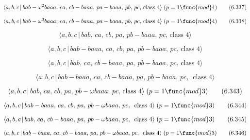 \documentclass[10pt]{article}
\begin{document}
\begin{equation}
\langle a,b,c\,|\,bab-\omega ^2baaa,\,ca,\,cb-baaa,\,pa-baaa,\,pb,\,pc,\,%
\text{class }4\rangle\;(p=1 \func{mod} 4)  \tag{6.337}
\end{equation}

\begin{equation}
\langle a,b,c\,|\,bab-\omega ^3baaa,\,ca,\,cb-baaa,\,pa-baaa,\,pb,\,pc,\,%
\text{class }4\rangle\;(p=1 \func{mod} 4)  \tag{6.338}
\end{equation}

\begin{equation}
\langle a,b,c\,|\,bab,\,ca,\,cb,\,pa,\,pb-baaa,\,pc,\,\text{class }4\rangle 
\tag{6.339}
\end{equation}

\begin{equation}
\langle a,b,c\,|\,bab-baaa,\,ca,\,cb,\,pa,\,pb-baaa,\,pc,\,\text{class }%
4\rangle  \tag{6.340}
\end{equation}

\begin{equation}
\langle a,b,c\,|\,bab,\,ca,\,cb-baaa,\,pa,\,pb-baaa,\,pc,\,\text{class }%
4\rangle  \tag{6.341}
\end{equation}

\begin{equation}
\langle a,b,c\,|\,bab-baaa,\,ca,\,cb-baaa,\,pa,\,pb-baaa,\,pc,\,\text{ class 
}4\rangle  \tag{6.342}
\end{equation}

\begin{equation}
\langle a,b,c\,|\,bab,\,ca,\,cb,\,pa,\,pb-\omega baaa,\,pc,\,\text{class }%
4\rangle\;(p=1 \func{mod} 3)  \tag{6.343}
\end{equation}

\begin{equation}
\langle a,b,c\,|\,bab-baaa,\,ca,\,cb,\,pa,\,pb-\omega baaa,\,pc,\,\text{
class }4\rangle\;(p=1 \func{mod} 3)  \tag{6.344}
\end{equation}

\begin{equation}
\langle a,b,c\,|\,bab,\,ca,\,cb-baaa,\,pa,\,pb-\omega baaa,\,pc,\,\text{
class }4\rangle\;(p=1 \func{mod} 3)  \tag{6.345}
\end{equation}

\begin{equation}
\langle a,b,c\,|\,bab-baaa,\,ca,\,cb-baaa,\,pa,\,pb-\omega baaa,\,pc,\,\text{
class }4\rangle\;(p=1 \func{mod} 3)  \tag{6.346}
\end{equation}
\end{document}

